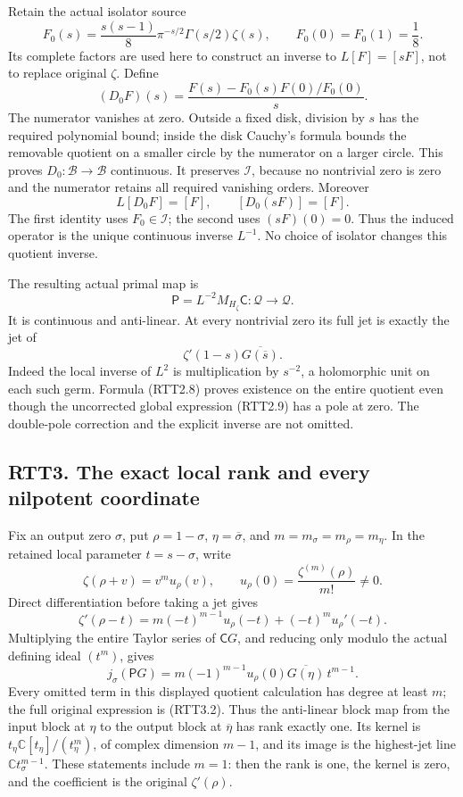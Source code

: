 Retain the actual isolator source \[
F_0(s)=\frac{s(s-1)}8\pi^{-s/2}\Gamma(s/2)\zeta(s),
\qquad F_0(0)=F_0(1)=\frac18.
\tag{RTT2.5}
\] Its complete factors are used here to construct an inverse to
\(L[F]=[sF]\), not to replace original \(\zeta\). Define \[
(D_0F)(s)=\frac{F(s)-F_0(s)F(0)/F_0(0)}s.
\tag{RTT2.6}
\] The numerator vanishes at zero. Outside a fixed disk, division by
\(s\) has the required polynomial bound; inside the disk Cauchy's
formula bounds the removable quotient on a smaller circle by the
numerator on a larger circle. This proves
\(D_0:\mathcal B\to\mathcal B\) continuous. It preserves \(\mathcal I\),
because no nontrivial zero is zero and the numerator retains all
required vanishing orders. Moreover \[
L[D_0F]=[F],\qquad [D_0(sF)]=[F].
\tag{RTT2.7}
\] The first identity uses \(F_0\in\mathcal I\); the second uses
\((sF)(0)=0\). Thus the induced operator is the unique continuous
inverse \(L^{-1}\). No choice of isolator changes this quotient inverse.

The resulting actual primal map is \[
\boxed{\mathsf P=L^{-2}M_{H_\zeta}\mathsf C:
\mathcal Q\longrightarrow\mathcal Q.}
\tag{RTT2.8}
\] It is continuous and anti-linear. At every nontrivial zero its full
jet is exactly the jet of \[
\zeta'(1-s)\overline{G(\overline s)}.
\tag{RTT2.9}
\] Indeed the local inverse of \(L^2\) is multiplication by \(s^{-2}\),
a holomorphic unit on each such germ. Formula (RTT2.8) proves existence
on the entire quotient even though the uncorrected global expression
(RTT2.9) has a pole at zero. The double-pole correction and the explicit
inverse are not omitted.

\subsection{RTT3. The exact local rank and every nilpotent
coordinate}\label{rtt3.-the-exact-local-rank-and-every-nilpotent-coordinate}

Fix an output zero \(\sigma\), put \(\rho=1-\sigma\),
\(\eta=\overline\sigma\), and \(m=m_\sigma=m_\rho=m_\eta\). In the
retained local parameter \(t=s-\sigma\), write \[
\zeta(\rho+v)=v^m u_\rho(v),\qquad
u_\rho(0)=\frac{\zeta^{(m)}(\rho)}{m!}\ne0.
\tag{RTT3.1}
\] Direct differentiation before taking a jet gives \[
\zeta'(\rho-t)=m(-t)^{m-1}u_\rho(-t)+(-t)^m u_\rho'(-t).
\tag{RTT3.2}
\] Multiplying the entire Taylor series of \(\mathsf C G\), and reducing
only modulo the actual defining ideal \((t^m)\), gives \[
j_\sigma(\mathsf P G)
=m(-1)^{m-1}u_\rho(0)\overline{G(\eta)}\,t^{m-1}.
\tag{RTT3.3}
\] Every omitted term in this displayed quotient calculation has degree
at least \(m\); the full original expression is (RTT3.2). Thus the
anti-linear block map from the input block at \(\eta\) to the output
block at \(\overline\eta\) has rank exactly one. Its kernel is
\(t_\eta\mathbb C[t_\eta]/(t_\eta^m)\), of complex dimension \(m-1\),
and its image is the highest-jet line \(\mathbb C t_\sigma^{m-1}\).
These statements include \(m=1\): then the rank is one, the kernel is
zero, and the coefficient is the original \(\zeta'(\rho)\).

